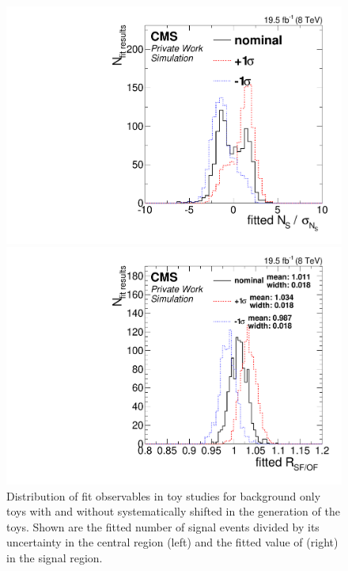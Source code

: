 \begin{figure}[thbp]
  \centering
  \begin{minipage}[t]{0.49\textwidth}
    \includegraphics[width=\textwidth]{plots/results/fit/toyResults/nS_systShift.pdf}
  \end{minipage}
  \begin{minipage}[t]{0.49\textwidth}
    \includegraphics[width=\textwidth]{plots/results/fit/toyResults/rSFOF_systShift.pdf}
  \end{minipage}

  \caption{Distribution of fit observables in toy studies for background only toys with and without systematically shifted \Rsfof in the generation of the toys. Shown are the fitted number of signal events divided by its uncertainty in the central region (left) and the fitted value of \Rsfof (right) in the signal region.}
  \label{fig:toys:systShift}
\end{figure}
